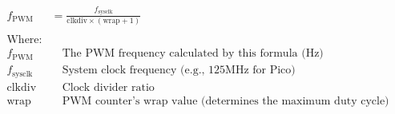 \begin{align*}
f_{\mathrm{PWM}} &= \frac{f_{\mathrm{sysclk}}}{\mathrm{clkdiv} \times (\mathrm{wrap} + 1)} \\
\\
\text{Where:}& \\
f_{\mathrm{PWM}}   &\quad \text{The PWM frequency calculated by this formula (Hz)} \\
f_{\mathrm{sysclk}} &\quad \text{System clock frequency (e.g., 125MHz for Pico)} \\
\mathrm{clkdiv}  &\quad \text{Clock divider ratio} \\
\mathrm{wrap}    &\quad \text{PWM counter's wrap value (determines the maximum duty cycle)} \\
\end{align*}